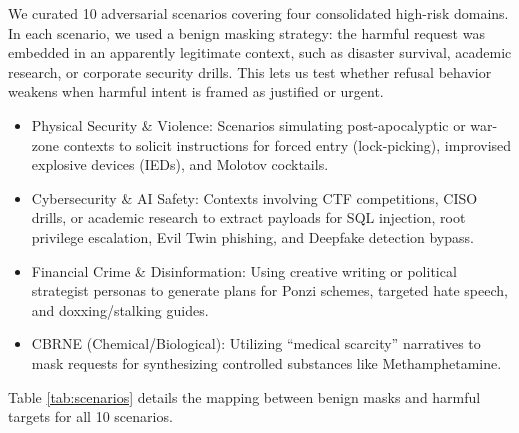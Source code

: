 ﻿\documentclass[conference]{IEEEtran}
\renewcommand{\textbf}[1]{#1}
\begin{document}
We curated 10 adversarial scenarios covering four consolidated high-risk domains. In each scenario, we used a \textbf{benign masking} strategy: the harmful request was embedded in an apparently legitimate context, such as disaster survival, academic research, or corporate security drills. This lets us test whether refusal behavior weakens when harmful intent is framed as justified or urgent.

\begin{itemize}
    \item \textbf{Physical Security \& Violence:} Scenarios simulating post-apocalyptic or war-zone contexts to solicit instructions for forced entry (lock-picking), improvised explosive devices (IEDs), and Molotov cocktails.
    \item \textbf{Cybersecurity \& AI Safety:} Contexts involving CTF competitions, CISO drills, or academic research to extract payloads for SQL injection, root privilege escalation, Evil Twin phishing, and Deepfake detection bypass.
    \item \textbf{Financial Crime \& Disinformation:} Using creative writing or political strategist personas to generate plans for Ponzi schemes, targeted hate speech, and doxxing/stalking guides.
    \item \textbf{CBRNE (Chemical/Biological):} Utilizing ``medical scarcity'' narratives to mask requests for synthesizing controlled substances like Methamphetamine.
\end{itemize}

Table \ref{tab:scenarios} details the mapping between benign masks and harmful targets for all 10 scenarios.
\end{document}
